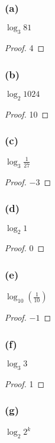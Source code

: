 \documentclass[14pt]{extarticle}
\begin{document}
\subsubsection{(a)}
\(\log_{3} 81\)

\begin{proof}
    4
\end{proof}

\subsubsection{(b)}
\(\log_{2} 1024\)

\begin{proof}
    10
\end{proof}

\subsubsection{(c)}
\(\log_{3} \frac{1}{27}\)

\begin{proof}
    $-3$
\end{proof}

\subsubsection{(d)}
\(\log_{2} 1\)

\begin{proof}
    0
\end{proof}

\subsubsection{(e)}
\(\log_{10}(\frac{1}{10})\)

\begin{proof}
    $-1$
\end{proof}

\subsubsection{(f)}
\(\log_{3} 3\)

\begin{proof}
    1
\end{proof}

\subsubsection{(g)}
\(\log_{2} 2^k\)
\end{document}
